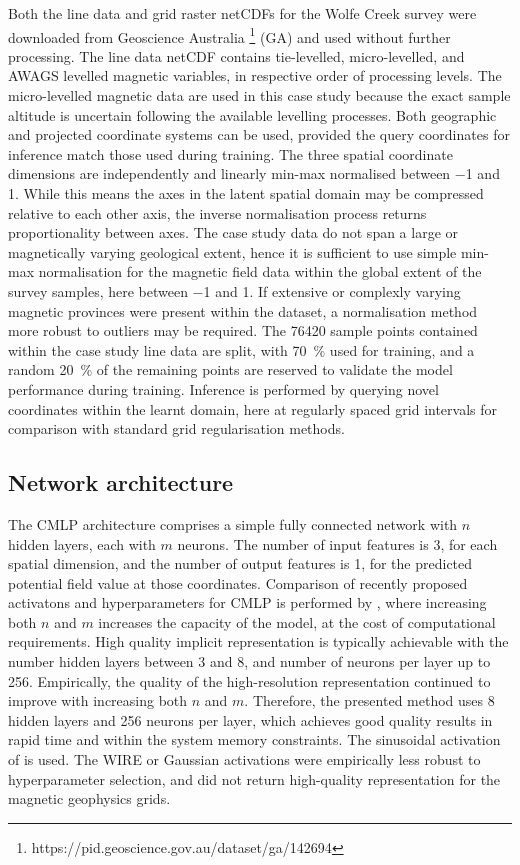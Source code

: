 Both the line data and grid raster netCDFs for the Wolfe Creek survey were downloaded from Geoscience Australia \footnote{https://pid.geoscience.gov.au/dataset/ga/142694} (GA) and used without further processing.
The line data netCDF contains tie-levelled, micro-levelled, and AWAGS levelled magnetic variables, in respective order of processing levels.
The micro-levelled magnetic data are used in this case study because the exact sample altitude is uncertain following the available levelling processes.
Both geographic and projected coordinate systems can be used, provided the query coordinates for inference match those used during training.
The three spatial coordinate dimensions are independently and linearly min-max normalised between \num{-1} and \num{1}.
While this means the axes in the latent spatial domain may be compressed relative to each other axis, the inverse normalisation process returns proportionality between axes.
The case study data do not span a large or magnetically varying geological extent, hence it is sufficient to use simple min-max normalisation for the magnetic field data within the global extent of the survey samples, here between \num{-1} and \num{1}.
If extensive or complexly varying magnetic provinces were present within the dataset, a normalisation method more robust to outliers may be required.
The \num{76420} sample points contained within the case study line data are split, with \qty{70}{\percent} used for training, and a random \qty{20}{\percent} of the remaining points are reserved to validate the model performance during training.
Inference is performed by querying novel coordinates within the learnt domain, here at regularly spaced grid intervals for comparison with standard grid regularisation methods.

\subsection{Network architecture}
The CMLP architecture comprises a simple fully connected network with \(n\) hidden layers, each with \(m\) neurons. %
The number of input features is 3, for each spatial dimension, and the number of output features is 1, for the predicted potential field value at those coordinates.
Comparison of recently proposed activatons and hyperparameters for CMLP is performed by \textcite{saragadamWIREWaveletImplicit2023}, where increasing both \(n\) and \(m\) increases the capacity of the model, at the cost of computational requirements.
High quality implicit representation is typically achievable with the number hidden layers between \num{3} and \num{8}, and number of neurons per layer up to \num{256}.
Empirically, the quality of the high-resolution representation continued to improve with increasing both \(n\) and \(m\).
Therefore, the presented method uses \num{8} hidden layers and \num{256} neurons per layer, which achieves good quality results in rapid time and within the system memory constraints.
The sinusoidal activation of \textcite{sitzmann2019siren} is used.
The WIRE or Gaussian activations were empirically less robust to hyperparameter selection, and did not return high-quality representation for the magnetic geophysics grids.

